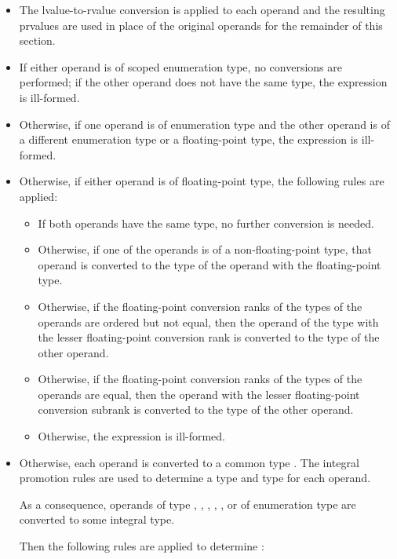 \begin{itemize}
\item The lvalue-to-rvalue conversion
is applied to each operand and
the resulting prvalues are used in place of the original operands
for the remainder of this section.
\item If either operand is of scoped enumeration type, no conversions
are performed; if the other operand does not have the same type, the expression is
ill-formed.
\item Otherwise, if one operand is of enumeration type and the other operand is
of a different enumeration type or a floating-point type, the expression is
ill-formed.
\item Otherwise, if either operand is of floating-point type,
the following rules are applied:
\begin{itemize}
\item
If both operands have the same type, no further conversion is needed.
\item
Otherwise, if one of the operands is of a non-floating-point type,
that operand is converted to the type of
the operand with the floating-point type.
\item
Otherwise, if the floating-point conversion ranks of
the types of the operands are ordered but not equal,
then the operand of the type with the lesser floating-point conversion rank
is converted to the type of the other operand.
\item
Otherwise, if the floating-point conversion ranks of the types of
the operands are equal,
then the operand with the lesser floating-point conversion subrank
is converted to the type of the other operand.
\item
Otherwise, the expression is ill-formed.
\end{itemize}
\item Otherwise, each operand is converted to a common type .
The integral promotion rules are used
to determine a type  and type  for each operand.
\begin{footnote}
As a consequence, operands of type , , ,
, , or of enumeration type are converted
to some integral type.
\end{footnote}
Then the following rules are applied to determine :

\begin{itemize}


\end{itemize}
\end{itemize}
